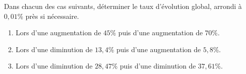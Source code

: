 \begin{exo}{}
	Dans chacun des cas suivants, déterminer le taux d'évolution global, arrondi à $0,01$\% près si nécessaire.
	\begin{enumerate}
		\item Lors d'une augmentation de $45\%$ puis d'une augmentation de $70\%$.
		\item Lors d'une diminution de $13,4$\% puis d'une augmentation de $5,8$\%.
		\item Lors d'une diminution de $28,47$\% puis d'une diminution de $37,61$\%.
	\end{enumerate}
\end{exo}
